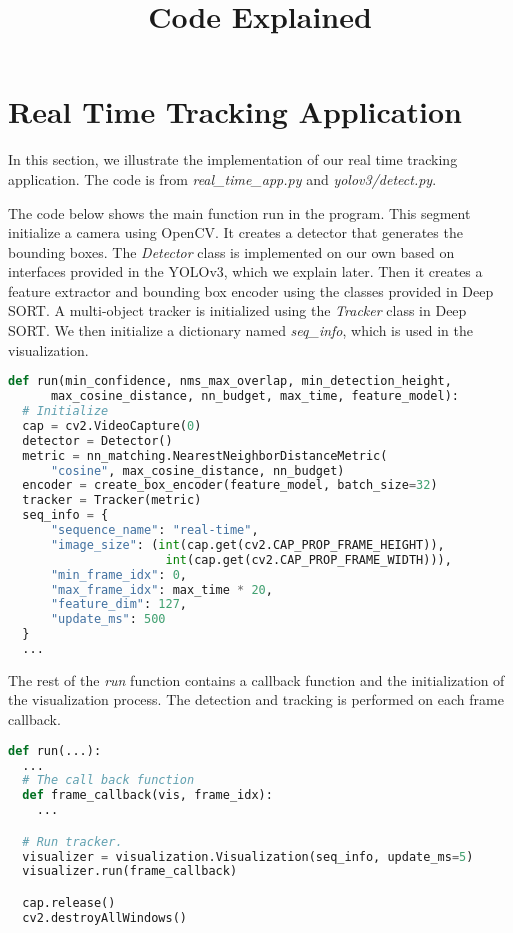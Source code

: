 \documentclass{article}
\title{Code Explained}
\date{}
\numberwithin{algorithm}{section}
\begin{document}
\maketitle

\section{Real Time Tracking Application}
In this section, we illustrate the implementation of our real time tracking application.
The code is from \textsl{real\_time\_app.py} and \textsl{yolov3/detect.py}.

The code below shows the main function run in the program.
This segment initialize a camera using OpenCV.
It creates a detector that generates the bounding boxes.
The \textsl{Detector} class is implemented on our own based on interfaces provided in the YOLOv3, which we explain later.
Then it creates a feature extractor and bounding box encoder using the classes provided in Deep SORT.
A multi-object tracker is initialized using the \textsl{Tracker} class in Deep SORT.
We then initialize a dictionary named \textsl{seq\_info}, which is used in the visualization.

\begin{lstlisting}[language=Python]
def run(min_confidence, nms_max_overlap, min_detection_height,
      max_cosine_distance, nn_budget, max_time, feature_model):
  # Initialize
  cap = cv2.VideoCapture(0)
  detector = Detector()
  metric = nn_matching.NearestNeighborDistanceMetric(
      "cosine", max_cosine_distance, nn_budget)
  encoder = create_box_encoder(feature_model, batch_size=32)
  tracker = Tracker(metric)
  seq_info = {
      "sequence_name": "real-time",
      "image_size": (int(cap.get(cv2.CAP_PROP_FRAME_HEIGHT)),
                      int(cap.get(cv2.CAP_PROP_FRAME_WIDTH))),
      "min_frame_idx": 0,
      "max_frame_idx": max_time * 20,
      "feature_dim": 127,
      "update_ms": 500
  }
  ...
\end{lstlisting}

The rest of the \textsl{run} function contains a callback function and the initialization of the visualization process.
The detection and tracking is performed on each frame callback.

\begin{lstlisting}[language=Python]
def run(...):
  ...
  # The call back function
  def frame_callback(vis, frame_idx):
    ...

  # Run tracker.
  visualizer = visualization.Visualization(seq_info, update_ms=5)
  visualizer.run(frame_callback)

  cap.release()
  cv2.destroyAllWindows()
\end{lstlisting}
\end{document}
